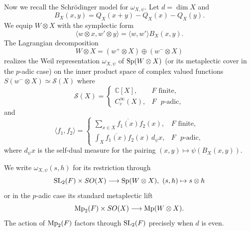 \documentclass[12pt]{amsart}
\theoremstyle{definition}
\theoremstyle{remark}
\begin{document}
Now we recall the Schr\"odinger model for $\omega_{X,\psi}$. Let $d=\dim X$ and 
\[
B_X(x,y)=Q_X(x+y)-Q_X(x)-Q_X(y).
\]
We equip $W\otimes X$ with the symplectic form
\[
\langle w\otimes x,w'\otimes y\rangle
=\langle w,w'\rangle B_X(x,y).
\]
The Lagrangian decomposition
\[
W\otimes X=(w^+\otimes X)\oplus(w^-\otimes X)
\]
realizes the Weil representation $\omega_{X,\psi}$ of
${\rm Sp}(W\otimes X)$ (or its metaplectic cover in the $p$-adic case) on the inner product space of complex valued functions 
$S(w^-\otimes X)\simeq\mathcal S(X)$ where 
\[
\mathcal S(X)=
\begin{cases}
\mathbb C[X], &\text{$F$ finite},\\
C_c^\infty(X), &\text{$F$ $p$-adic},
\end{cases}
\]
and 
\[
\langle f_1,f_2\rangle=
\begin{cases}
\displaystyle\sum_{x\in X}\overline{f_1(x)}f_2(x),
&\text{$F$ finite},\\
\displaystyle\int_X\overline{f_1(x)}f_2(x)\,d_\psi x,
&\text{$F$ $p$-adic},
\end{cases}
\]
where $d_\psi x$ is the self-dual measure for the pairing
$(x,y)\mapsto\psi(B_X(x,y))$.

We write $\omega_{X,\psi}(s,h)$ for its restriction through
\[
{\rm SL}_2(F)\times SO(X)
\longrightarrow {\rm Sp}(W\otimes X), ~
(s,h) \mapsto s\otimes h
\]
or in the $p$-adic case its standard metaplectic lift 
\[{\rm Mp}_2(F) \times SO(X) \longrightarrow {\rm Mp}(W \otimes X).\]
The action of ${\rm Mp}_2(F)$ factors through ${\rm SL}_2(F)$ precisely when $d$ is even.
\end{document}
